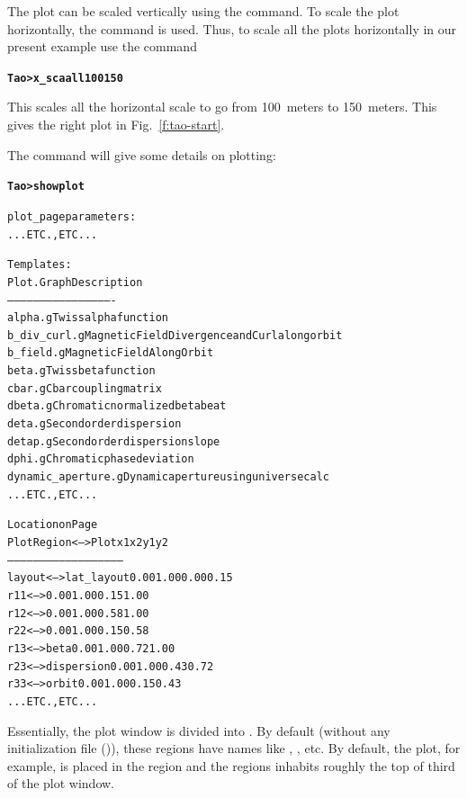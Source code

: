 \documentclass{hitec}
\newcommand{\BF}[1]{{\normalfont\textbf{#1}}}
\newenvironment{display}
  {\vspace*{-1.5ex} \begin{alltt}}
  {\end{alltt} \vspace*{-1.0ex}}
\begin{document}
The plot can be scaled vertically using the  command. To scale the plot horizontally, 
the command  is used. Thus, to scale all the plots horizontally in our present example use
the command
\begin{display}
  \BF{Tao> x_sca all 100 150}
\end{display}
This scales all the horizontal scale to go from 100~meters to 150~meters. This gives the
right plot in Fig.~\ref{f:tao-start}.

The  command will give some details on plotting:
\begin{display}
  \BF{Tao> show plot}

    plot_page parameters:
    ... ETC., ETC ...

  Templates:
     Plot                  .Graph   Description
     --------------------  -------- -------------------
     alpha                 .g       Twiss alpha function
     b_div_curl            .g       Magnetic Field Divergence and Curl along orbit
     b_field               .g       Magnetic Field Along Orbit
     beta                  .g       Twiss beta function
     cbar                  .g       Cbar coupling matrix
     dbeta                 .g       Chromatic normalized beta beat
     deta                  .g       Second order dispersion
     detap                 .g       Second order dispersion slope
     dphi                  .g       Chromatic phase deviation
     dynamic_aperture      .g       Dynamic aperture using universe calc
    ... ETC., ETC ...

                                                 Location on Page
  Plot Region         <-->  Plot                 x1    x2    y1    y2
  -----------               -----------------------------------------
  layout              <-->  lat_layout          0.00  1.00  0.00  0.15
  r11                 <-->                      0.00  1.00  0.15  1.00
  r12                 <-->                      0.00  1.00  0.58  1.00
  r22                 <-->                      0.00  1.00  0.15  0.58
  r13                 <-->  beta                0.00  1.00  0.72  1.00
  r23                 <-->  dispersion          0.00  1.00  0.43  0.72
  r33                 <-->  orbit               0.00  1.00  0.15  0.43
    ... ETC., ETC ...
\end{display}
Essentially, the plot window is divided into . By default (without any
initialization file ()), these regions have names like ,
, etc. By default, the  plot, for example, is placed in the 
region and the  regions inhabits roughly the top of third of the plot window. 
\end{document}
